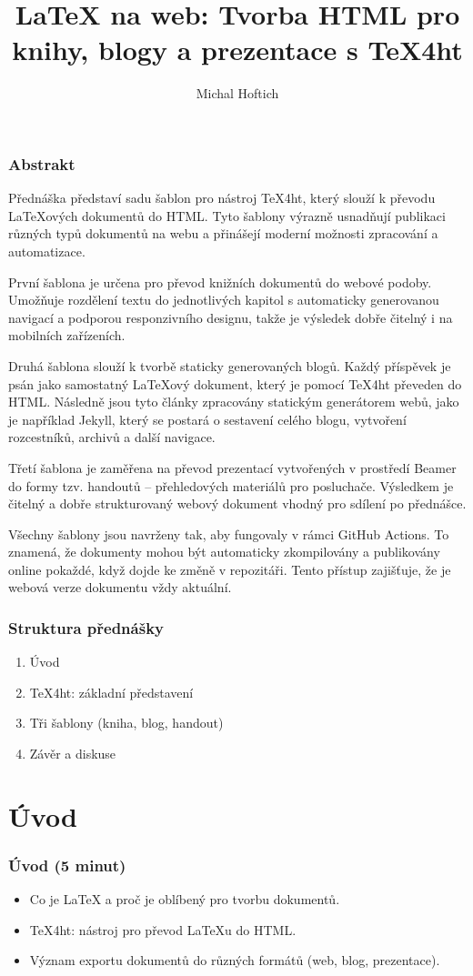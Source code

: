 \documentclass{beamer}
\title{LaTeX na web: Tvorba HTML pro knihy, blogy a prezentace s TeX4ht}
\author{Michal Hoftich}
\date{}
\begin{document}
\frame{\titlepage}

\begin{frame}
\frametitle{Abstrakt}

Přednáška představí sadu šablon pro nástroj TeX4ht, který slouží k převodu
LaTeXových dokumentů do HTML. Tyto šablony výrazně usnadňují publikaci různých
typů dokumentů na webu a přinášejí moderní možnosti zpracování a automatizace.

První šablona je určena pro převod knižních dokumentů do webové podoby.
Umožňuje rozdělení textu do jednotlivých kapitol s automaticky generovanou
navigací a podporou responzivního designu, takže je výsledek dobře čitelný i na
mobilních zařízeních.

Druhá šablona slouží k tvorbě staticky generovaných blogů. Každý příspěvek je
psán jako samostatný LaTeXový dokument, který je pomocí TeX4ht převeden do
HTML. Následně jsou tyto články zpracovány statickým generátorem webů, jako je
například Jekyll, který se postará o sestavení celého blogu, vytvoření
rozcestníků, archivů a další navigace.

Třetí šablona je zaměřena na převod prezentací vytvořených v prostředí Beamer
do formy tzv. handoutů – přehledových materiálů pro posluchače. Výsledkem je
čitelný a dobře strukturovaný webový dokument vhodný pro sdílení po přednášce.

Všechny šablony jsou navrženy tak, aby fungovaly v rámci GitHub Actions. To
znamená, že dokumenty mohou být automaticky zkompilovány a publikovány online
pokaždé, když dojde ke změně v repozitáři. Tento přístup zajišťuje, že je
webová verze dokumentu vždy aktuální.




\end{frame}

\begin{frame}
\frametitle{Struktura přednášky}
\begin{enumerate}
    \item Úvod
    \item TeX4ht: základní představení
    \item Tři šablony (kniha, blog, handout)
    \item Závěr a diskuse
\end{enumerate}
\end{frame}

\section{Úvod}
\begin{frame}
\frametitle{Úvod (5 minut)}
\begin{itemize}
    \item Co je LaTeX a proč je oblíbený pro tvorbu dokumentů.
    \item TeX4ht: nástroj pro převod LaTeXu do HTML.
    \item Význam exportu dokumentů do různých formátů (web, blog, prezentace).
\end{itemize}
\end{frame}
\end{document}
